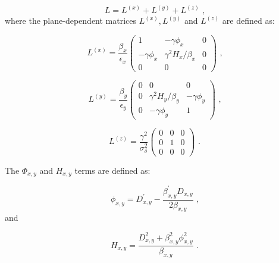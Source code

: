 \begin{equation}
    L = L^{(x)} + L^{(y)} + L^{(z)} \text{ ,}
\end{equation}
where the plane-dependent matrices \(L^{(x)}, L^{(y)}\) and \(L^{(z)}\) are defined as:

\begin{equation}
    L^{(x)} = \frac{\beta_x}{\epsilon_x} \left(
        \begin{array}{ccc}
            1              & -\gamma \phi_x         & 0 \\
            -\gamma \phi_x & \gamma^2 H_x / \beta_x & 0 \\
            0              & 0                      & 0
        \end{array} \right) \text{ ,}
\end{equation}

\begin{equation}
    L^{(y)} = \frac{\beta_y}{\epsilon_y} \left(
        \begin{array}{ccc}
            0 & 0                      & 0 \\
            0 & \gamma^2 H_y / \beta_y & -\gamma \phi_y \\
            0 & -\gamma \phi_y         & 1
        \end{array} \right) \text{ ,}
\end{equation}

\begin{equation}
    L^{(z)} = \frac{\gamma^2}{\sigma_\delta^2} \left(
        \begin{array}{lll}
            0 & 0 & 0 \\
            0 & 1 & 0 \\
            0 & 0 & 0
        \end{array} \right) \text{ .}
\end{equation}

The \(\Phi_{x,y}\) and \(H_{x,y}\) terms are defined as:

\begin{equation}
    \phi_{x,y} = D_{x,y}^{\prime} - \frac{\beta_{x,y}^{\prime} D_{x,y}}{2 \beta_{x,y}} \text{ ,}
    \label{equation:bm_phi}
\end{equation}
and

\begin{equation}
    H_{x,y} = \frac{D_{x,y}^2 + \beta_{x,y}^2 \phi_{x,y}^2}{\beta_{x,y}} \text{ .}
    \label{equation:bm_h}
\end{equation}

